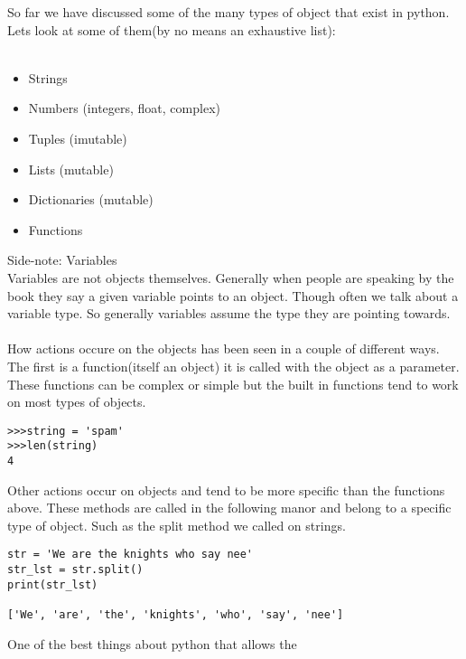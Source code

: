 \documentclass[../main.tex]{subfiles}
\begin{document}
So far we have discussed some of the many types of object that exist in python. Lets look at some of them(by no means an exhaustive list):\\
\\
\begin{minipage}[t]{0.5\linewidth}
    \begin{itemize}
        \item Strings
        \item Numbers (integers, float, complex)
        \item Tuples (imutable)
    \end{itemize}
\end{minipage}
\hfill
\begin{minipage}[t]{0.5\linewidth}
    \begin{itemize}
        \item Lists (mutable)
        \item Dictionaries (mutable)
        \item Functions
    \end{itemize}
\end{minipage}

\vspace{.5cm}
Side-note: Variables\\
Variables are not objects themselves. Generally when people are speaking by the book they say a given variable points to an object. Though often we talk about a variable type. So generally variables assume the type they are pointing towards.\\
\\
How actions occure on the objects has been seen in a couple of different ways. The first is a function(itself an object) it is called with the object as a parameter. These functions can be complex or simple but the built in functions tend to work on most types of objects.\\
\begin{verbatim}
>>>string = 'spam'
>>>len(string)
4
\end{verbatim}
Other actions occur on objects and tend to be more specific than the functions above. These methods are called in the following manor and belong to a specific type of object. Such as the split method we called on strings.\\
\begin{verbatim}
str = 'We are the knights who say nee'
str_lst = str.split()
print(str_lst)

['We', 'are', 'the', 'knights', 'who', 'say', 'nee']
\end{verbatim}
One of the best things about python that allows the
\end{document}
